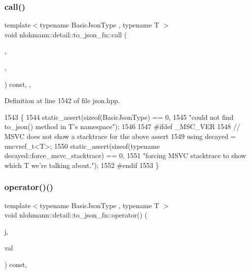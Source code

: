\subsubsection{\texorpdfstring{call()}{call()}\hspace{0.1cm}{\footnotesize\ttfamily [2/2]}}
{\footnotesize\ttfamily template$<$typename Basic\+Json\+Type , typename T $>$ \\
void nlohmann\+::detail\+::to\+\_\+json\+\_\+fn\+::call (\begin{DoxyParamCaption}\item[{Basic\+Json\+Type \&}]{,  }\item[{T \&\&}]{,  }\item[{\hyperlink{structnlohmann_1_1detail_1_1priority__tag}{priority\+\_\+tag}$<$ 0 $>$}]{ }\end{DoxyParamCaption}) const\hspace{0.3cm}{\ttfamily [inline]}, {\ttfamily [private]}, {\ttfamily [noexcept]}}



Definition at line 1542 of file json.\+hpp.


\begin{DoxyCode}
1543     \{
1544         static\_assert(\textcolor{keyword}{sizeof}(BasicJsonType) == 0,
1545                       \textcolor{stringliteral}{"could not find to\_json() method in T's namespace"});
1546 
1547 \textcolor{preprocessor}{#ifdef \_MSC\_VER}
1548         \textcolor{comment}{// MSVC does not show a stacktrace for the above assert}
1549         \textcolor{keyword}{using} decayed = uncvref\_t<T>;
1550         static\_assert(\textcolor{keyword}{sizeof}(\textcolor{keyword}{typename} decayed::force\_msvc\_stacktrace) == 0,
1551                       \textcolor{stringliteral}{"forcing MSVC stacktrace to show which T we're talking about."});
1552 \textcolor{preprocessor}{#endif}
1553     \}
\end{DoxyCode}
\mbox{\label{structnlohmann_1_1detail_1_1to__json__fn_ac63f82d3eed085522f1cbe99a521a4d4}} 
\subsubsection{\texorpdfstring{operator()()}{operator()()}}
{\footnotesize\ttfamily template$<$typename Basic\+Json\+Type , typename T $>$ \\
void nlohmann\+::detail\+::to\+\_\+json\+\_\+fn\+::operator() (\begin{DoxyParamCaption}\item[{Basic\+Json\+Type \&}]{j,  }\item[{T \&\&}]{val }\end{DoxyParamCaption}) const\hspace{0.3cm}{\ttfamily [inline]}, {\ttfamily [noexcept]}}



